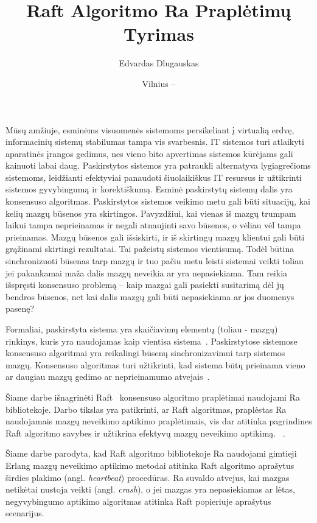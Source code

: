 \documentclass{VUMIFPSkursinis}
\title{Raft Algoritmo Ra Praplėtimų Tyrimas}
\author{Edvardas Dlugauskas}
\date{Vilnius – \the\year}
\begin{document}
\maketitle
\tableofcontents


Mūsų amžiuje, esminėms visuomenės sistemoms persikeliant į virtualią erdvę, informacinių sistemų stabilumas tampa vis svarbesnis. IT sistemos turi atlaikyti aparatinės įrangos gedimus, nes vieno bito apvertimas sistemos kūrėjams gali kainuoti labai daug. Paskirstytos sistemos yra patraukli alternatyva lygiagrečioms sistemoms, leidžianti efektyviai panaudoti šiuolaikiškus IT resursus ir užtikrinti sistemos gyvybingumą ir korektiškumą. Esminė paskirstytų sistemų dalis yra konsensuso algoritmas. Paskirstytos sistemos veikimo metu gali būti situacijų, kai kelių mazgų būsenos yra skirtingos. Pavyzdžiui, kai vienas iš mazgų trumpam laikui tampa neprieinamas ir negali atnaujinti savo būsenos, o vėliau vėl tampa prieinamas. Mazgų būsenos gali išsiskirti, ir iš skirtingų mazgų klientui gali būti grąžinami skirtingi rezultatai. Tai pažeistų sistemos vientisumą. Todėl būtina sinchronizuoti būsenas tarp mazgų ir tuo pačiu metu leisti sistemai veikti toliau jei pakankamai maža dalis mazgų neveikia ar yra nepasiekiama. Tam reikia išspręsti konsensuso problemą -- kaip mazgai gali pasiekti susitarimą dėl jų bendros būsenos, net kai dalis mazgų gali būti nepasiekiama ar jos duomenys pasenę?

Formaliai, paskirstyta sistema yra skaičiavimų elementų (toliau - mazgų) rinkinys, kuris yra naudojamas kaip vientisa sistema~\cite{steen_distributed_2017}. Paskirstytose sistemose konsensuso algoritmai yra reikalingi būsenų sinchronizavimui tarp sistemos mazgų. Konsensuso algoritmas turi užtikrinti, kad sistema būtų prieinama vieno ar daugiau mazgų gedimo ar neprieinamumo atvejais~\cite{ongaro_consensus}. 

Šiame darbe išnagrinėti Raft~\cite{ongaro_consensus} konsensuso algoritmo praplėtimai naudojami Ra bibliotekoje. Darbo tikslas yra patikrinti, ar Raft algoritmas, praplėstas Ra naudojamais mazgų neveikimo aptikimo praplėtimais, vis dar atitinka pagrindines Raft algoritmo savybes ir užtikrina efektyvų mazgų neveikimo aptikimą. ~\cite{ongaro_consensus, rabbitmqra}.

Šiame darbe parodyta, kad Raft algoritmo bibliotekoje Ra naudojami gimtieji Erlang mazgų neveikimo aptikimo metodai atitinka Raft algoritmo aprašytus širdies plakimo (angl. \textit{heartbeat}) procedūras. Ra suvaldo atvejus, kai mazgas netikėtai nustoja veikti (angl. \textit{crash}), o jei mazgas yra nepasiekiamas ar lėtas, negyvybingumo aptikimo algoritmas atitinka Raft popieriuje aprašytus scenarijus.
\end{document}
